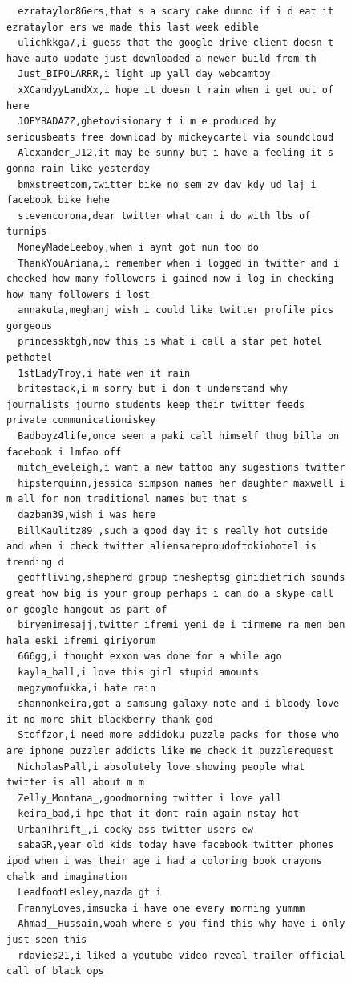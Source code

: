 \begin{figure}[htpb]
\begin{verbatim}
  ezrataylor86ers,that s a scary cake dunno if i d eat it ezrataylor ers we made this last week edible
  ulichkkga7,i guess that the google drive client doesn t have auto update just downloaded a newer build from th
  Just_BIPOLARRR,i light up yall day webcamtoy
  xXCandyyLandXx,i hope it doesn t rain when i get out of here
  JOEYBADAZZ,ghetovisionary t i m e produced by seriousbeats free download by mickeycartel via soundcloud
  Alexander_J12,it may be sunny but i have a feeling it s gonna rain like yesterday
  bmxstreetcom,twitter bike no sem zv dav kdy ud laj i facebook bike hehe
  stevencorona,dear twitter what can i do with lbs of turnips
  MoneyMadeLeeboy,when i aynt got nun too do
  ThankYouAriana,i remember when i logged in twitter and i checked how many followers i gained now i log in checking how many followers i lost
  annakuta,meghanj wish i could like twitter profile pics gorgeous
  princessktgh,now this is what i call a star pet hotel pethotel
  1stLadyTroy,i hate wen it rain
  britestack,i m sorry but i don t understand why journalists journo students keep their twitter feeds private communicationiskey
  Badboyz4life,once seen a paki call himself thug billa on facebook i lmfao off
  mitch_eveleigh,i want a new tattoo any sugestions twitter
  hipsterquinn,jessica simpson names her daughter maxwell i m all for non traditional names but that s
  dazban39,wish i was here
  BillKaulitz89_,such a good day it s really hot outside and when i check twitter aliensareproudoftokiohotel is trending d
  geoffliving,shepherd group thesheptsg ginidietrich sounds great how big is your group perhaps i can do a skype call or google hangout as part of
  biryenimesajj,twitter ifremi yeni de i tirmeme ra men ben hala eski ifremi giriyorum
  666gg,i thought exxon was done for a while ago
  kayla_ball,i love this girl stupid amounts
  megzymofukka,i hate rain
  shannonkeira,got a samsung galaxy note and i bloody love it no more shit blackberry thank god
  Stoffzor,i need more addidoku puzzle packs for those who are iphone puzzler addicts like me check it puzzlerequest
  NicholasPall,i absolutely love showing people what twitter is all about m m
  Zelly_Montana_,goodmorning twitter i love yall
  keira_bad,i hpe that it dont rain again nstay hot
  UrbanThrift_,i cocky ass twitter users ew
  sabaGR,year old kids today have facebook twitter phones ipod when i was their age i had a coloring book crayons chalk and imagination
  LeadfootLesley,mazda gt i
  FrannyLoves,imsucka i have one every morning yummm
  Ahmad__Hussain,woah where s you find this why have i only just seen this
  rdavies21,i liked a youtube video reveal trailer official call of black ops


\end{verbatim}
\end{figure}
